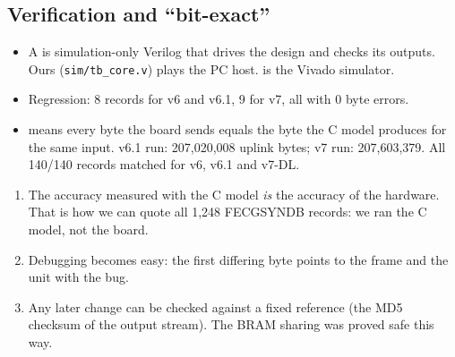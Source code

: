 \documentclass[11pt]{article}
\newcommand{\ttt}[1]{\texttt{#1}}
\begin{document}
\subsection{Verification and ``bit-exact''}
\label{sec:bitexact}
\begin{center}
\end{center}
\begin{itemize}
  \item A  is simulation-only Verilog that drives the design and checks its outputs. Ours (\ttt{sim/tb\_core.v}) plays the PC host.  is the Vivado simulator.
  \item Regression: 8 records for v6 and v6.1, 9 for v7, all with 0 byte errors.
  \item {} means every byte the board sends equals the byte the C model produces for the same input. v6.1 run: 207,020,008 uplink bytes; v7 run: 207,603,379. All 140/140 records matched for v6, v6.1 and v7-DL.
\end{itemize}

\begin{simple}
\begin{enumerate}
  \item The accuracy measured with the C model \emph{is} the accuracy of the hardware. That is how we can quote all 1,248 FECGSYNDB records: we ran the C model, not the board.
  \item Debugging becomes easy: the first differing byte points to the frame and the unit with the bug.
  \item Any later change can be checked against a fixed reference (the MD5 checksum of the output stream). The BRAM sharing was proved safe this way.
\end{enumerate}
\end{simple}
\end{document}
